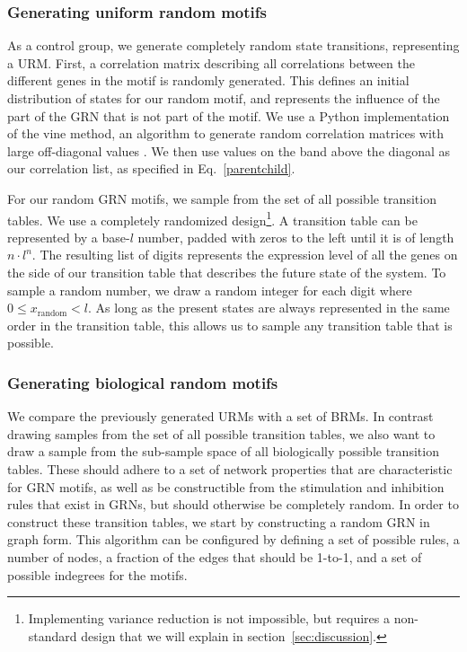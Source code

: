 \documentclass[../main.tex]{subfiles}
\begin{document}
\subsubsection{Generating uniform random motifs}

As a control group, we generate completely random state transitions, representing a URM.
First, a correlation matrix describing all correlations between the different genes in the motif is randomly generated.
This defines an initial distribution of states for our random motif, and represents the influence of the part of the GRN that is not part of the motif.
We use a Python implementation of the vine method, an algorithm to generate random correlation matrices with large off-diagonal values \cite{lewandowski2009generating}.
We then use values on the band above the diagonal as our correlation list, as specified in Eq.~\ref{parentchild}. %

For our random GRN motifs, we sample from the set of all possible transition tables.
We use a completely randomized design\footnote{Implementing variance reduction is not impossible, but requires a non-standard design that we will explain in section~\ref{sec:discussion}.}.
A transition table can be represented by a base-$l$ number, padded with zeros to the left until it is of length $n \cdot l^n$.
The resulting list of digits represents the expression level of all the genes on the side of our transition table that describes the future state of the system.
To sample a random number, we draw a random integer for each digit where $0 \le x_\mathrm{random} < l$.
As long as the present states are always represented in the same order in the transition table, this allows us to sample any transition table that is possible.

\subsubsection{Generating biological random motifs}

We compare the previously generated URMs with a set of BRMs.
In contrast drawing samples from the set of all possible transition tables, we also want to draw a sample from the sub-sample space of all biologically possible transition tables.
These should adhere to a set of network properties that are characteristic for GRN motifs, as well as be constructible from the stimulation and inhibition rules that exist in GRNs, but should otherwise be completely random.
In order to construct these transition tables, we start by constructing a random GRN in graph form.
This algorithm can be configured by defining a set of possible rules, a number of nodes, a fraction of the edges that should be 1-to-1, and a set of possible indegrees for the motifs.
\end{document}
